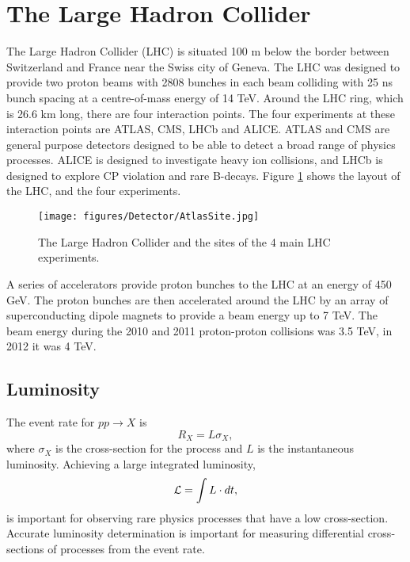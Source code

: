 \section{The Large Hadron Collider}
\label{sec:Det:LHC}

The Large Hadron Collider (LHC) is situated 100 m below the border between Switzerland and France near the Swiss city of Geneva. 
The LHC was designed to provide two proton beams with 2808 bunches in each beam colliding with 25 ns bunch spacing at a centre-of-mass energy of 14 TeV.
Around the LHC ring, which is 26.6 km long, there are four interaction points. 
The four experiments at these interaction points are ATLAS, CMS, LHCb and ALICE.
ATLAS and CMS are general purpose detectors designed to be able to detect a broad range of physics processes. 
ALICE is designed to investigate heavy ion collisions, and LHCb is designed to explore CP violation and rare B-decays.
Figure \ref{Det:LHC} shows the layout of the LHC, and the four experiments.

\begin{figure}
\centering
\texttt{[image: figures/Detector/AtlasSite.jpg]}
  \caption[The Large Hadron Collider complex]{
The Large Hadron Collider and the sites of the 4 main LHC experiments.
\label{Det:LHC}
}
\end{figure}

A series of accelerators provide proton bunches to the LHC at an energy of 450 GeV.
The proton bunches are then accelerated around the LHC by an array of superconducting dipole magnets to provide a beam energy up to 7 TeV.
The beam energy during the 2010 and 2011 proton-proton collisions was 3.5 TeV, in 2012 it was 4 TeV.


\subsection{Luminosity}

The event rate for $pp \rightarrow X$ is
\begin{equation}
R_X = L \sigma_X,
\label{Det:Lumi}
\end{equation}
where $\sigma_X$ is the cross-section for the process and $L$ is the instantaneous luminosity.
Achieving a large integrated luminosity,
\begin{equation}
{\cal L} = \int L\cdot dt,
\label{Det:IntLumi}
\end{equation}
is important for observing rare physics processes that have a low cross-section. 
Accurate luminosity determination is important for measuring differential cross-sections of processes from the event rate. 

